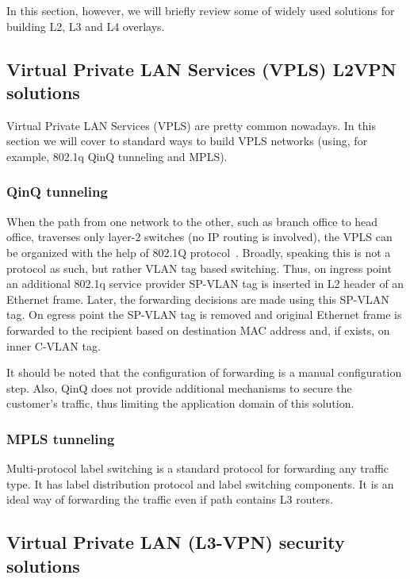 In this section, however, we will briefly review some of widely used solutions 
for building L2, L3 and L4 overlays.

\subsection{Virtual Private LAN Services (VPLS) L2VPN solutions}

Virtual Private LAN Services (VPLS) are pretty common nowadays. In this section we will cover 
to standard ways to build VPLS networks (using, for example, 802.1q QinQ tunneling and MPLS).

\subsubsection{QinQ tunneling}

When the path from one network to the other, such as branch office to head office,
traverses only layer-2 switches (\ie no IP routing is involved), the VPLS can be organized 
with the help of 802.1Q protocol~\cite{snr}. Broadly, speaking this is not a protocol as such, but rather 
VLAN tag based switching. Thus, on ingress point an additional 802.1q service provider SP-VLAN tag 
is inserted in L2 header of an Ethernet frame. Later, the forwarding decisions are 
made using this SP-VLAN tag. On egress point the SP-VLAN tag is removed and original 
Ethernet frame is forwarded to the recipient based on destination MAC address 
and, if exists, on inner C-VLAN tag. 

It should be noted that the configuration of forwarding is a manual configuration step.
Also, QinQ does not provide additional mechanisms to secure the customer's traffic,
thus limiting the application domain of this solution.

\subsubsection{MPLS tunneling}

Multi-protocol label switching is a standard protocol for forwarding any traffic type.
It has label distribution protocol and label switching components. It is an ideal way 
of forwarding the traffic even if path contains L3 routers.

\subsection{Virtual Private LAN (L3-VPN) security solutions}

